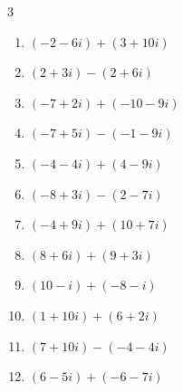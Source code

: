 \begin{multicols}{3}
\begin{enumerate}
        \phantom{$\displaystyle =11+7i$}

  \item $\displaystyle (-2-6i) + (3+10i)$

        \phantom{$\displaystyle =1+4i$}

  \item $\displaystyle (2+3i) - (2+6i)$

        \phantom{$\displaystyle =-3i$}

  \item $\displaystyle (-7+2i) + (-10-9i)$

        \phantom{$\displaystyle =-17-7i$}

  \item $\displaystyle (-7+5i) - (-1-9i)$

        \phantom{$\displaystyle =-6+14i$}

  \item $\displaystyle (-4-4i) + (4-9i)$

        \phantom{$\displaystyle =-13i$}

\columnbreak %

\resetques

  \item $\displaystyle (-8+3i) - (2-7i)$

        \phantom{$\displaystyle =-10+10i$}

  \item $\displaystyle (-4+9i) + (10+7i)$

        \phantom{$\displaystyle =6+16i$}

  \item $\displaystyle (8+6i) + (9+3i)$

        \phantom{$\displaystyle =17+9i$}

  \item $\displaystyle (10-i) + (-8-i)$

        \phantom{$\displaystyle =2-2i$}

  \item $\displaystyle (1+10i) + (6+2i)$

        \phantom{$\displaystyle =7+12i$}

  \item $\displaystyle (7+10i) - (-4-4i)$

        \phantom{$\displaystyle =11+14i$}

  \item $\displaystyle (6-5i) + (-6-7i)$

        \phantom{$\displaystyle =-12i$}


\end{enumerate}
\end{multicols}
